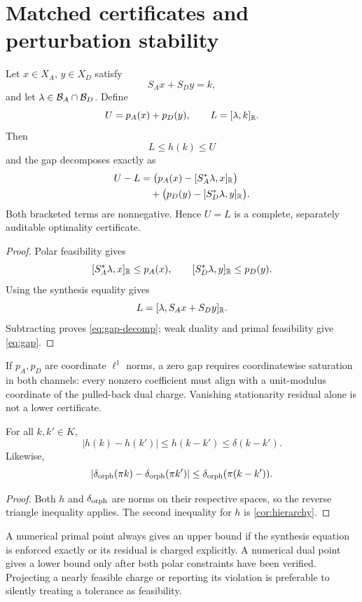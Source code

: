 \section{Matched certificates and perturbation stability}
\label{sec:stability}

\begin{theorem}\label{thm:gap}
Let \(x\in X_A\), \(y\in X_D\) satisfy
\[
 S_Ax+S_Dy=k,
\]
and let \(\lambda\in\mathcal B_A\cap\mathcal B_D\).  Define
\[
 U=p_A(x)+p_D(y),
 \qquad
 L=[\lambda,k]_{\mathbb R}.
\]
Then
\begin{equation}\label{eq:gap}
 L\le h(k)\le U
\end{equation}
and the gap decomposes exactly as
\begin{align}
 U-L
 &=
 \bigl(p_A(x)-[S_A^*\lambda,x]_{\mathbb R}\bigr)
 \nonumber\\
 &\quad+
 \bigl(p_D(y)-[S_D^*\lambda,y]_{\mathbb R}\bigr).
 \label{eq:gap-decomp}
\end{align}
Both bracketed terms are nonnegative.  Hence \(U=L\) is a complete,
separately auditable optimality certificate.
\end{theorem}

\begin{proof}
Polar feasibility gives
\[
 [S_A^*\lambda,x]_{\mathbb R}\le p_A(x),
 \qquad
 [S_D^*\lambda,y]_{\mathbb R}\le p_D(y).
\]
Using the synthesis equality gives
\[
 L=[\lambda,S_Ax+S_Dy]_{\mathbb R}.
\]
Subtracting proves \eqref{eq:gap-decomp}; weak duality and primal
feasibility give \eqref{eq:gap}.
\end{proof}

\begin{corollary}\label{cor:saturation}
If \(p_A,p_D\) are coordinate \(\ell^1\) norms, a zero gap requires
coordinatewise saturation in both channels: every nonzero coefficient
must align with a unit-modulus coordinate of the pulled-back dual
charge.  Vanishing stationarity residual alone is not a lower
certificate.
\end{corollary}

\begin{proposition}\label{prop:lipschitz}
For all \(k,k'\in K\),
\[
 |h(k)-h(k')|\le h(k-k')\le\delta(k-k').
\]
Likewise,
\[
 |\delta_{\rm orph}(\pi k)-\delta_{\rm orph}(\pi k')|
 \le\delta_{\rm orph}(\pi(k-k')).
\]
\end{proposition}

\begin{proof}
Both \(h\) and \(\delta_{\rm orph}\) are norms on their respective
spaces, so the reverse triangle inequality applies.  The second
inequality for \(h\) is \cref{cor:hierarchy}.
\end{proof}

\begin{remark}
A numerical primal point always gives an upper bound if the synthesis
equation is enforced exactly or its residual is charged explicitly.
A numerical dual point gives a lower bound only after both polar
constraints have been verified.  Projecting a nearly feasible charge
or reporting its violation is preferable to silently treating a
tolerance as feasibility.
\end{remark}
